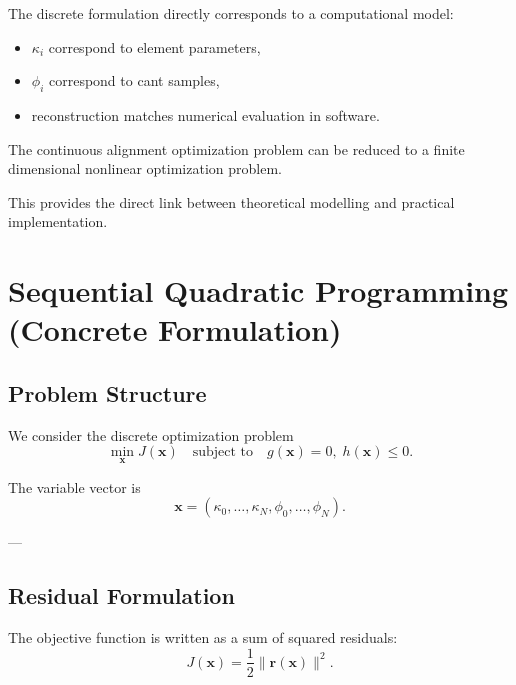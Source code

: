 \begin{remark}
The discrete formulation directly corresponds to a computational model:
\begin{itemize}
\item \(\kappa_i\) correspond to element parameters,
\item \(\phi_i\) correspond to cant samples,
\item reconstruction matches numerical evaluation in software.
\end{itemize}
\end{remark}

\begin{summary}
The continuous alignment optimization problem can be reduced to a finite
dimensional nonlinear optimization problem.

This provides the direct link between theoretical modelling and
practical implementation.
\end{summary}

\section{Sequential Quadratic Programming (Concrete Formulation)}

\subsection{Problem Structure}

\begin{remark}
We consider the discrete optimization problem
\[
\min_{\mathbf{x}} J(\mathbf{x})
\quad \text{subject to} \quad
g(\mathbf{x}) = 0,\;
h(\mathbf{x}) \le 0.
\]
\end{remark}

\begin{remark}
The variable vector is
\[
\mathbf{x} =
(\kappa_0,\dots,\kappa_N,\phi_0,\dots,\phi_N).
\]
\end{remark}

---

\subsection{Residual Formulation}

\begin{definition}
The objective function is written as a sum of squared residuals:
\[
J(\mathbf{x}) = \frac{1}{2} \| \mathbf{r}(\mathbf{x}) \|^2.
\]
\end{definition}

